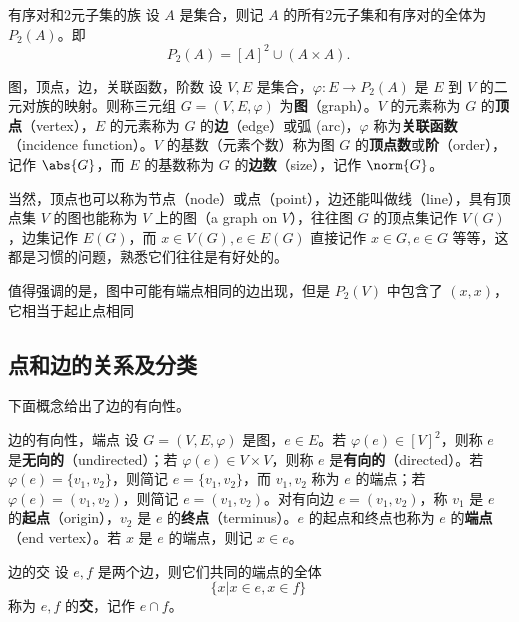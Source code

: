 \begin{definition}{有序对和2元子集的族}
设 $A$ 是集合，则记 $A$ 的所有2元子集和有序对的全体为 $P_2(A)$。即
\begin{equation}
P_2(A)=[A]^2\cup (A\times A).~
\end{equation}

\end{definition}


\begin{definition}{图，顶点，边，关联函数，阶数}
设 $V,E$ 是集合，$\varphi:E\rightarrow P_2(A)$ 是 $E$ 到 $V$ 的二元对族的映射。则称三元组 $G=(V,E,\varphi)$ 为\textbf{图}（graph）。$V$ 的元素称为 $G$ 的\textbf{顶点}（vertex），$E$ 的元素称为 $G$ 的\textbf{边}（edge）或弧 (arc)，$\varphi$ 称为\textbf{关联函数}（incidence function）。$V$ 的基数（元素个数）称为图 $G$ 的\textbf{顶点数}或\textbf{阶}（order），记作 $\abs{G}$，而 $E$ 的基数称为 $G$ 的\textbf{边数}（size），记作 $\norm{G}$。
\end{definition}


当然，顶点也可以称为节点（node）或点（point），边还能叫做线（line），具有顶点集 $V$ 的图也能称为 $V$ 上的图（a graph on $V$），往往图 $G$ 的顶点集记作 $V(G)$，边集记作 $E(G)$，而 $x\in V(G),e\in E(G)$ 直接记作 $x\in G,e\in G$ 等等，这都是习惯的问题，熟悉它们往往是有好处的。

值得强调的是，图中可能有端点相同的边出现，但是 $P_2(V)$ 中包含了 $(x,x)$，它相当于起止点相同

\subsection{点和边的关系及分类}


下面概念给出了边的有向性。
\begin{definition}{边的有向性，端点}
设 $G=(V,E,\varphi)$ 是图，$e\in E$。若 $\varphi(e)\in[V]^2$，则称 $e$ 是\textbf{无向的}（undirected）；若 $\varphi(e)\in V\times V$，则称 $e$ 是\textbf{有向的}（directed）。若 $\varphi(e)=\{v_1,v_2\}$，则简记 $e=\{v_1,v_2\}$，而 $v_1,v_2$ 称为 $e$ 的端点；若 $\varphi(e)=(v_1,v_2)$，则简记 $e=(v_1,v_2)$。对有向边 $e=(v_1,v_2)$，称 $v_1$ 是 $e$ 的\textbf{起点}（origin），$v_2$ 是 $e$ 的\textbf{终点}（terminus）。$e$ 的起点和终点也称为 $e$ 的\textbf{端点}（end vertex）。若 $x$ 是 $e$ 的端点，则记 $x\in e$。
\end{definition}

\begin{definition}{边的交}
设 $e,f$ 是两个边，则它们共同的端点的全体
\begin{equation}
\{x|x\in e,x\in f\}~
\end{equation}
称为 $e,f$ 的\textbf{交}，记作 $e\cap f$。
\end{definition}

